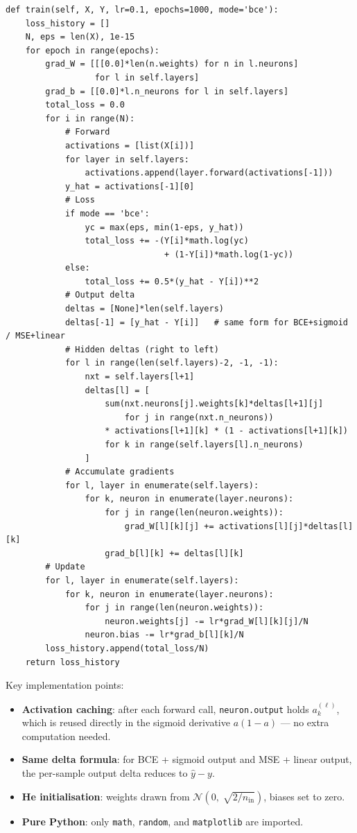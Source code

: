 \documentclass[12pt,a4paper]{article}
\begin{document}
\begin{lstlisting}[caption={train() method – backpropagation core}]
def train(self, X, Y, lr=0.1, epochs=1000, mode='bce'):
    loss_history = []
    N, eps = len(X), 1e-15
    for epoch in range(epochs):
        grad_W = [[[0.0]*len(n.weights) for n in l.neurons]
                  for l in self.layers]
        grad_b = [[0.0]*l.n_neurons for l in self.layers]
        total_loss = 0.0
        for i in range(N):
            # Forward
            activations = [list(X[i])]
            for layer in self.layers:
                activations.append(layer.forward(activations[-1]))
            y_hat = activations[-1][0]
            # Loss
            if mode == 'bce':
                yc = max(eps, min(1-eps, y_hat))
                total_loss += -(Y[i]*math.log(yc)
                                + (1-Y[i])*math.log(1-yc))
            else:
                total_loss += 0.5*(y_hat - Y[i])**2
            # Output delta
            deltas = [None]*len(self.layers)
            deltas[-1] = [y_hat - Y[i]]   # same form for BCE+sigmoid / MSE+linear
            # Hidden deltas (right to left)
            for l in range(len(self.layers)-2, -1, -1):
                nxt = self.layers[l+1]
                deltas[l] = [
                    sum(nxt.neurons[j].weights[k]*deltas[l+1][j]
                        for j in range(nxt.n_neurons))
                    * activations[l+1][k] * (1 - activations[l+1][k])
                    for k in range(self.layers[l].n_neurons)
                ]
            # Accumulate gradients
            for l, layer in enumerate(self.layers):
                for k, neuron in enumerate(layer.neurons):
                    for j in range(len(neuron.weights)):
                        grad_W[l][k][j] += activations[l][j]*deltas[l][k]
                    grad_b[l][k] += deltas[l][k]
        # Update
        for l, layer in enumerate(self.layers):
            for k, neuron in enumerate(layer.neurons):
                for j in range(len(neuron.weights)):
                    neuron.weights[j] -= lr*grad_W[l][k][j]/N
                neuron.bias -= lr*grad_b[l][k]/N
        loss_history.append(total_loss/N)
    return loss_history
\end{lstlisting}

Key implementation points:
\begin{itemize}
    \item \textbf{Activation caching}: after each forward call, \texttt{neuron.output}
          holds $a_k^{(\ell)}$, which is reused directly in the sigmoid derivative
          $a(1-a)$ --- no extra computation needed.
    \item \textbf{Same delta formula}: for BCE + sigmoid output and MSE + linear output,
          the per-sample output delta reduces to $\hat{y} - y$.
    \item \textbf{He initialisation}: weights drawn from
          $\mathcal{N}(0,\; \sqrt{2/n_{\mathrm{in}}})$,
          biases set to zero.
    \item \textbf{Pure Python}: only \texttt{math}, \texttt{random},
          and \texttt{matplotlib} are imported.
\end{itemize}
\end{document}
